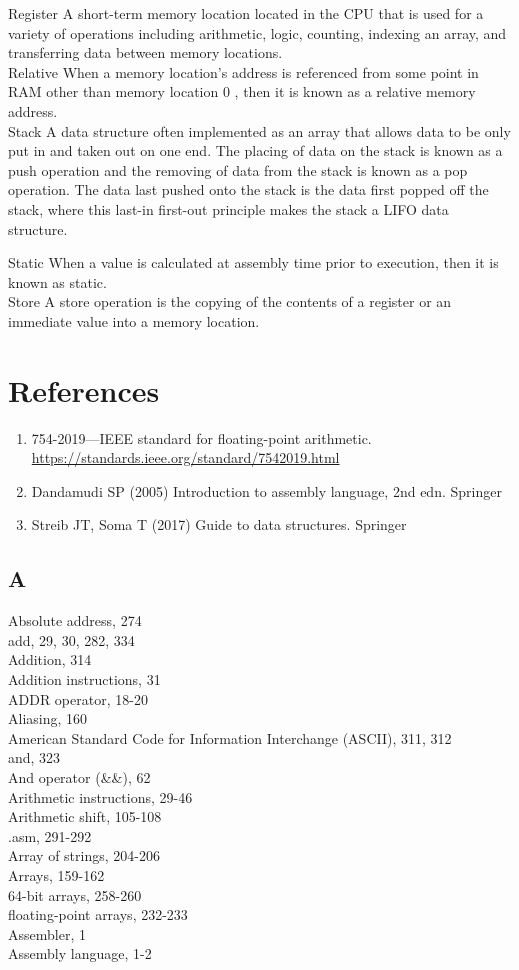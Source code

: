 \documentclass[10pt]{book}
\begin{document}
Register A short-term memory location located in the CPU that is used for a variety of operations including arithmetic, logic, counting, indexing an array, and transferring data between memory locations.\\
Relative When a memory location's address is referenced from some point in RAM other than memory location 0 , then it is known as a relative memory address.\\
Stack A data structure often implemented as an array that allows data to be only put in and taken out on one end. The placing of data on the stack is known as a push operation and the removing of data from the stack is known as a pop operation. The data last pushed onto the stack is the data first popped off the stack, where this last-in first-out principle makes the stack a LIFO data structure.

Static When a value is calculated at assembly time prior to execution, then it is known as static.\\
Store A store operation is the copying of the contents of a register or an immediate value into a memory location.
\chapter{References}
\begin{enumerate}
  \item 754-2019—IEEE standard for floating-point arithmetic. \href{https://standards.ieee.org/standard/7542019.html}{https://standards.ieee.org/standard/7542019.html}
  \item Dandamudi SP (2005) Introduction to assembly language, 2nd edn. Springer
  \item Streib JT, Soma T (2017) Guide to data structures. Springer
\end{enumerate}

\section{A}
Absolute address, 274\\
add, 29, 30, 282, 334\\
Addition, 314\\
Addition instructions, 31\\
ADDR operator, 18-20\\
Aliasing, 160\\
American Standard Code for Information Interchange (ASCII), 311, 312\\
and, 323\\
And operator (\&\&), 62\\
Arithmetic instructions, 29-46\\
Arithmetic shift, 105-108\\
.asm, 291-292\\
Array of strings, 204-206\\
Arrays, 159-162\\
64-bit arrays, 258-260\\
floating-point arrays, 232-233\\
Assembler, 1\\
Assembly language, 1-2
\end{document}
